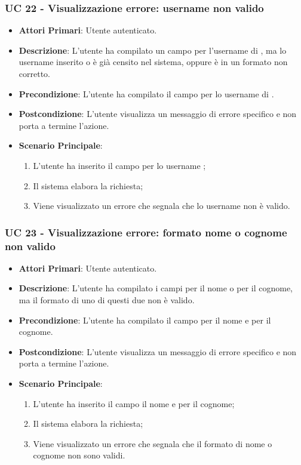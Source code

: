 
		\subsubsection{UC 22 - Visualizzazione errore: username  non valido}
		\begin{itemize}
			\item \textbf{Attori Primari}: Utente autenticato.
			\item \textbf{Descrizione}: L'utente ha compilato un campo per l'username di , ma lo username inserito o è già censito nel sistema, oppure è in un formato non corretto.
			\item \textbf{Precondizione}: L'utente ha compilato il campo per lo username di .
			\item \textbf{Postcondizione}: L'utente visualizza un messaggio di errore specifico e non porta a termine l'azione.
			\item \textbf{Scenario Principale}:
			\begin{enumerate}
				\item L'utente ha inserito il campo per lo username ;
				\item Il sistema elabora la richiesta;
				\item Viene visualizzato un errore che segnala che lo username  non è valido.
			\end{enumerate}
		\end{itemize}



		\subsubsection{UC 23 - Visualizzazione errore: formato nome o cognome non valido}
		\begin{itemize}
			\item \textbf{Attori Primari}: Utente autenticato.
			\item \textbf{Descrizione}: L'utente ha compilato i campi per il nome o per il cognome, ma il formato di uno di questi due non è valido.
			\item \textbf{Precondizione}: L'utente ha compilato il campo per il nome e per il cognome.
			\item \textbf{Postcondizione}: L'utente visualizza un messaggio di errore specifico e non porta a termine l'azione.
			\item \textbf{Scenario Principale}:
			\begin{enumerate}
				\item L'utente ha inserito il campo il nome e per il cognome;
				\item Il sistema elabora la richiesta;
				\item Viene visualizzato un errore che segnala che il formato di nome o cognome non sono validi.
			\end{enumerate}
		\end{itemize}